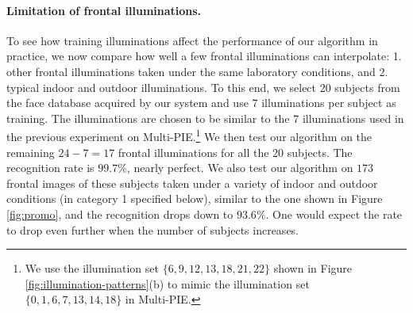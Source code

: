 \paragraph{Limitation of frontal illuminations.}
To see how training illuminations affect the performance of our algorithm in practice, we now compare how well a few frontal illuminations can interpolate: 1. other frontal illuminations taken under the same laboratory conditions, and 2. typical indoor and outdoor illuminations. To this end, we select 20 subjects from the face database acquired by our system and use 7 illuminations per subject as training. The illuminations are chosen to be similar to the 7 illuminations used in the previous experiment on Multi-PIE.\footnote{We use the illumination set $\{6, 9, 12, 13, 18, 21, 22\}$ shown in Figure \ref{fig:illumination-patterns}(b) to mimic the illumination set $\{0, 1, 6, 7, 13, 14, 18\}$ in Multi-PIE.} We then test our algorithm on the remaining $24 - 7 = 17$ frontal illuminations for all the 20 subjects. The recognition rate is $99.7\%$, nearly perfect. We also test our algorithm on $173$ frontal images of these subjects taken under a variety of indoor and outdoor conditions (in category 1 specified below), similar to the one shown in Figure \ref{fig:promo}, and the recognition drops down to $93.6\%$. One would expect the rate to drop even further when the number of subjects increases.\vspace{0mm}


